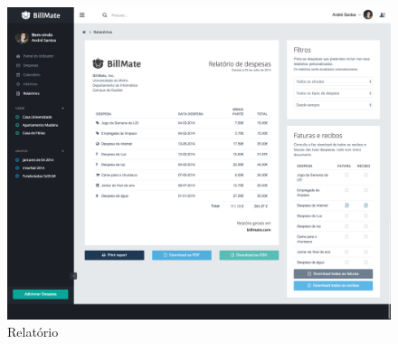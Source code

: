 \begin{figure}[H]
\includegraphics[width=.5\textwidth]{images/andre/reports}
\caption{Relatório}
\end{figure}
